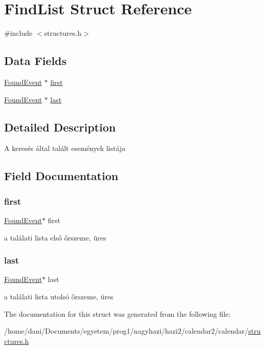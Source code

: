 \hypertarget{struct_find_list}{}\section{Find\+List Struct Reference}
\label{struct_find_list}


{\ttfamily \#include $<$structures.\+h$>$}

\subsection*{Data Fields}
\begin{DoxyCompactItemize}
\item 
\hyperlink{struct_found_event}{Found\+Event} $\ast$ \hyperlink{struct_find_list_a9f9781ae49412999177095cb5e8c79d1}{first}
\item 
\hyperlink{struct_found_event}{Found\+Event} $\ast$ \hyperlink{struct_find_list_ab61e64643b8233c6d9feef3e2aaffef2}{last}
\end{DoxyCompactItemize}


\subsection{Detailed Description}
A keresés által talált események listája 

\subsection{Field Documentation}
\mbox{\label{struct_find_list_a9f9781ae49412999177095cb5e8c79d1}} 
\subsubsection{\texorpdfstring{first}{first}}
{\footnotesize\ttfamily \hyperlink{struct_found_event}{Found\+Event}$\ast$ first}

a találati lista első őrszeme, üres \mbox{\label{struct_find_list_ab61e64643b8233c6d9feef3e2aaffef2}} 
\subsubsection{\texorpdfstring{last}{last}}
{\footnotesize\ttfamily \hyperlink{struct_found_event}{Found\+Event}$\ast$ last}

a találati lista utolsó őrszeme, üres 

The documentation for this struct was generated from the following file\+:\begin{DoxyCompactItemize}
\item 
/home/dani/\+Documents/egyetem/prog1/nagyhazi/hazi2/calendar2/calendar/\hyperlink{structures_8h}{structures.\+h}\end{DoxyCompactItemize}
